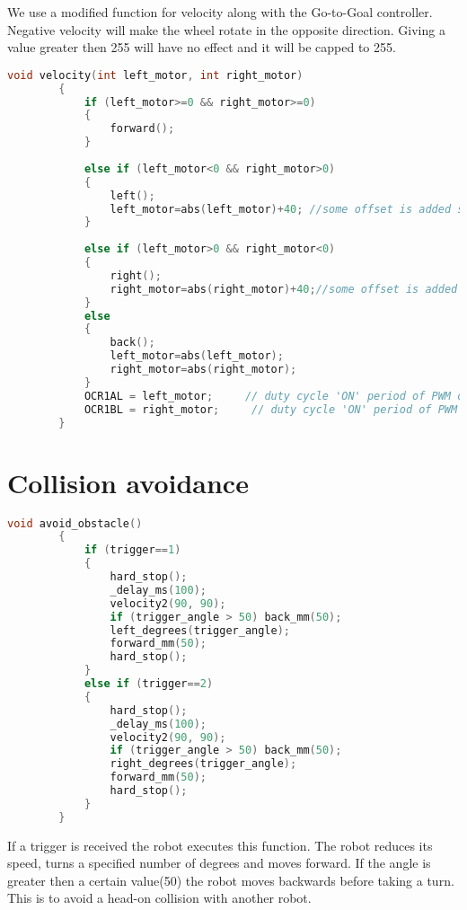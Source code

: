 \documentclass[main.tex]{subfiles}
\begin{document}
		\pagebreak
		We use a modified function for velocity along with the Go-to-Goal controller. Negative velocity will make the wheel rotate in the opposite direction. Giving a value greater then 255 will have no effect and it will be capped to 255.
		
		\begin{lstlisting}[language=C, caption = velocity function]
		void velocity(int left_motor, int right_motor)
		{
			if (left_motor>=0 && right_motor>=0)
			{
				forward();
			}
			
			else if (left_motor<0 && right_motor>0)
			{
				left();
				left_motor=abs(left_motor)+40; //some offset is added so that the wheel still turns at lower values
			}
			
			else if (left_motor>0 && right_motor<0)
			{
				right();
				right_motor=abs(right_motor)+40;//some offset is added so that the wheel still turns at lower values
			}
			else 
			{
				back();
				left_motor=abs(left_motor);
				right_motor=abs(right_motor);
			}
			OCR1AL = left_motor;     // duty cycle 'ON' period of PWM out for Left motor
			OCR1BL = right_motor;     // duty cycle 'ON' period of PWM out for Right motor
		}
		\end{lstlisting}
		
	\pagebreak
	\section{Collision avoidance}
	
	\begin{lstlisting}[language = C, caption = Collision avoidance function]
		void avoid_obstacle()
		{
			if (trigger==1)
			{
				hard_stop();
				_delay_ms(100);
				velocity2(90, 90);
				if (trigger_angle > 50) back_mm(50);
				left_degrees(trigger_angle);
				forward_mm(50);
				hard_stop();
			}
			else if (trigger==2)
			{
				hard_stop();
				_delay_ms(100);
				velocity2(90, 90);
				if (trigger_angle > 50)	back_mm(50);
				right_degrees(trigger_angle);
				forward_mm(50);
				hard_stop();
			}
		}
	\end{lstlisting}
	
	If a trigger is received the robot executes this function. The robot reduces its speed, turns a specified number of degrees and moves forward. If the angle is greater then a certain value(50) the robot moves backwards before taking a turn. This is to avoid a head-on collision with another robot.  
			
\end{document}
